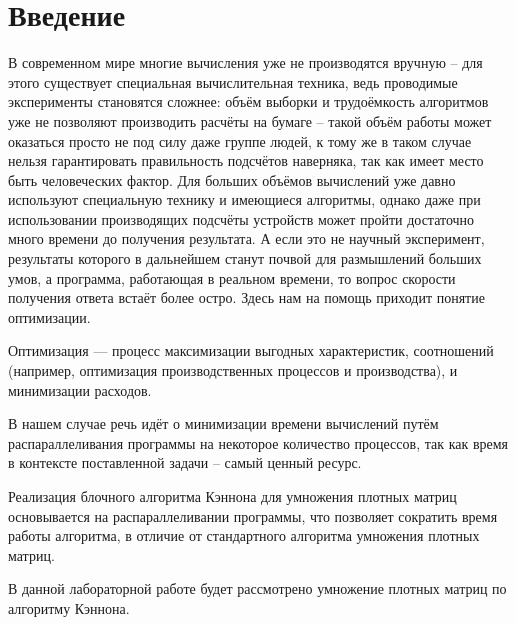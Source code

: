 \documentclass{report}
\begin{document}
\setcounter{page}{2}

\tableofcontents
\newpage

\section*{Введение}
В современном мире многие вычисления уже не производятся вручную – для этого существует специальная вычислительная техника, ведь проводимые эксперименты становятся сложнее: объём выборки и трудоёмкость алгоритмов уже не позволяют производить расчёты на бумаге – такой объём работы может оказаться просто не под силу даже группе людей, к тому же в таком случае нельзя гарантировать правильность подсчётов наверняка, так как имеет место быть человеческих фактор. Для больших объёмов вычислений уже давно используют специальную технику и имеющиеся алгоритмы, однако даже при использовании производящих подсчёты
устройств может пройти достаточно много времени до получения результата. А если это не научный эксперимент, результаты которого в дальнейшем станут почвой для размышлений больших умов, а программа, работающая в реальном времени, то вопрос скорости получения ответа встаёт более остро. Здесь нам на помощь приходит понятие оптимизации.
\par Оптимизация — процесс максимизации выгодных характеристик, соотношений (например, оптимизация производственных процессов и производства), и минимизации расходов.
\par В нашем случае речь идёт о минимизации времени вычислений путём распараллеливания программы на некоторое количество процессов, так как время в контексте поставленной задачи – самый ценный ресурс.
\par Реализация блочного алгоритма Кэннона для умножения плотных матриц основывается на
распараллеливании программы, что позволяет сократить время работы алгоритма, в отличие от
стандартного алгоритма умножения плотных матриц.
\par В данной лабораторной работе будет рассмотрено умножение плотных матриц по алгоритму Кэннона.
\newpage

\end{document}
